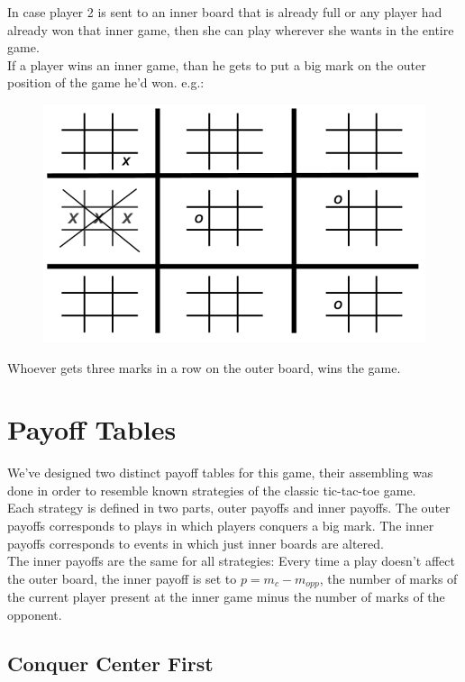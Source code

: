 \documentclass[10pt]{article}
\begin{document}
In case player 2 is sent to an inner board that is already full or any player had already won that inner game, then she can play wherever she wants in the entire game.\\
If a player wins an inner game, than he gets to put a big mark on the outer position of the game he'd won. e.g.:

\begin{figure}[h]
\centering
\includegraphics[scale=0.3]{img/ultimate4.png}
\end{figure}

Whoever gets three marks in a row on the outer board, wins the game.\\

\section{Payoff Tables}
We've designed two distinct payoff tables for this game, their assembling was done in order to resemble known strategies of the classic tic-tac-toe game.\\

Each strategy is defined in two parts, outer payoffs and inner payoffs. The outer payoffs corresponds to plays in which players conquers a big mark. The inner payoffs corresponds to events in which just inner boards are altered.\\

The inner payoffs are the same for all strategies: Every time a play doesn't affect the outer board, the inner payoff is set to $p = m_c - m_{opp}$, the number of marks of the current player present at the inner game minus the number of marks of the opponent.

\subsection{Conquer Center First}
\end{document}
